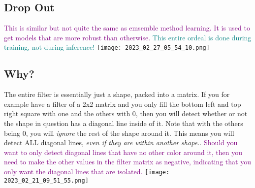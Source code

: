 \documentclass[main.tex,fontsize=8pt,paper=a4,paper=portrait,DIV=calc,]{scrartcl}
\begin{document}
\subsection{Drop Out}
\textcolor{purple}{This is similar but not quite the same as emsemble method learning.\newline
It is used to get models that are more robust than otherwise.}\newline
\textcolor{teal}{This entire ordeal is done during training, not during inference!}
\texttt{[image: 2023\_02\_27\_05\_54\_10.png]}

\subsection{Why?}
The entire filter is essentially just a shape, packed into a matrix.\newline
If you for example have a filter of a 2x2 matrix and you only fill the bottom left and top right square with one and the others with 0, then you will detect whether or not the shape in question has a diagonal line inside of it.\newline
Note that with the others being 0, you will \emph{ignore} the rest of the shape around it. This means you will detect ALL diagonal lines, \emph{even if they are within another shape.}.\newline
\textcolor{purple}{Should you want to only detect diagonal lines that have no other color around it, then you need to make the other values in the filter matrix as negative, indicating that you only want the diagonal lines that are isolated.}\newline
\texttt{[image: 2023\_02\_21\_09\_51\_55.png]}
\end{document}
